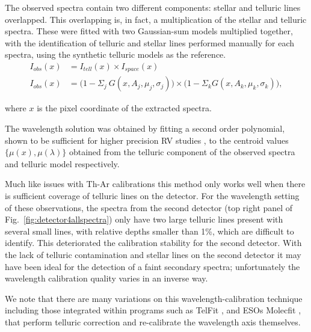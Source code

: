 The observed spectra contain two different components: stellar and telluric lines overlapped. This overlapping is, in fact, a multiplication of the stellar and telluric spectra. These were fitted with two Gaussian-sum models multiplied together, with the identification of telluric and stellar lines performed manually for each spectra, using the synthetic telluric models as the reference.
\begin{align}
I_{obs}(x) &= I_{tell}(x) \times I_{space}(x) \nonumber \\
I_{obs}(x) &= \Big(1 - {\Sigma}_{j}\ G(x, A_{j}, {\mu}_{j}, {\sigma}_{j})\Big) \times \Big(1 - {\Sigma}_{k} G(x, A_{k}, {\mu}_{k}, {\sigma}_{k})\Big), \label{eqn:obs}
\end{align}

where \(x \) is the pixel coordinate of the extracted spectra.

The wavelength solution was obtained by fitting a second order polynomial, shown to be sufficient for higher precision RV studies \citep[e.g.][]{bean_groundbased_2010, figueira_radial_2010}, to the centroid values \(\{\mu(x), \mu(\lambda)\} \) obtained from the telluric component of the observed spectra and telluric model respectively. 

Much like issues with Th-Ar calibrations this method only works well when there is sufficient coverage of telluric lines on the detector. For the wavelength setting of these observations, the spectra from the second detector (top right panel of Fig.~\ref{fig:detector4allspectra}) only have two large telluric lines present with several small lines, with relative depths smaller than 1\%, which are difficult to identify. This deteriorated the calibration stability for the second detector. With the lack of telluric contamination and stellar lines on the second detector it may have been ideal for the detection of a faint secondary spectra; unfortunately the wavelength calibration quality varies in an inverse way.

We note that there are many variations on this wavelength-calibration technique including those integrated within programs such as TelFit \citet{gullikson_correcting_2014}, and ESOs Molecfit \citet{smette_molecfit_2015}, that perform telluric correction and re-calibrate the wavelength axis themselves.



